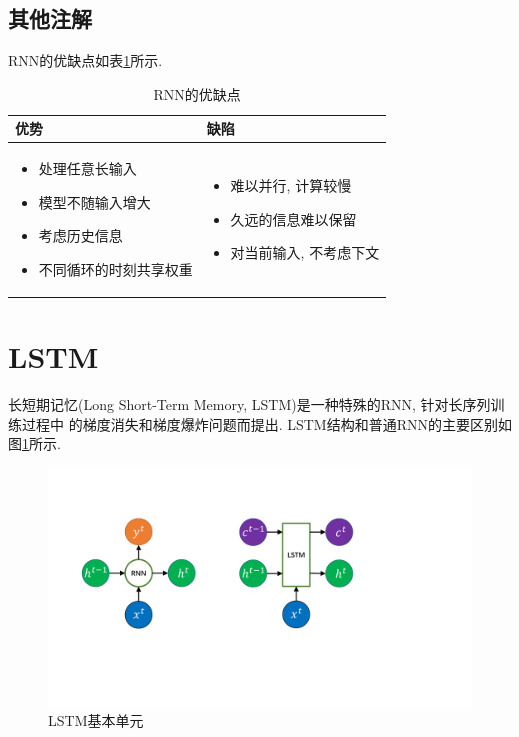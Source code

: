 \documentclass[UTF8, twocolumn]{ctexart}
\begin{document}
\subsection{其他注解}
RNN的优缺点如表\ref{trnn1}所示\cite{2}. 

\begin{table}
\caption{RNN的优缺点}
	\centering
	\small
	\begin{tabular}{ll}
	\toprule
    优势 & 缺陷\\
    \midrule
    \begin{minipage}[t]{.4\linewidth}
    \begin{itemize}[leftmargin=*]
        \item 处理任意长输入
        \item 模型不随输入增大
        \item 考虑历史信息
        \item 不同循环的时刻共享权重
    \end{itemize}
    \end{minipage} &
    \begin{minipage}[t]{.4\linewidth}
    \begin{itemize}[leftmargin=*]
        \item 难以并行, 计算较慢
        \item 久远的信息难以保留
        \item 对当前输入, 不考虑下文
    \end{itemize}
    \end{minipage} \\
    \bottomrule
	\end{tabular}
	\label{trnn1}
\end{table}



\section{LSTM}
长短期记忆(Long Short-Term Memory, LSTM)是一种特殊的RNN, 针对长序列训练过程中
的梯度消失和梯度爆炸问题而提出. LSTM结构和普通RNN的主要区别如图\ref{lstm1}所示. 

\begin{figure}[!hbt]
    \center
    \includegraphics[width=0.8\linewidth]{lstm1.pdf}
    \caption{LSTM基本单元}
    \label{lstm1}
\end{figure}
\end{document}
